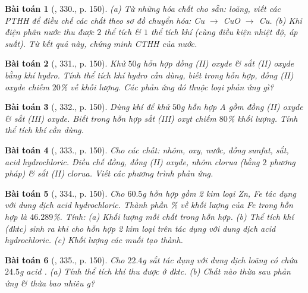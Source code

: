 \documentclass{article}
\newtheorem{baitoan}{Bài toán}
\begin{document}
\begin{baitoan}[\cite{An_400_BT_Hoa_Hoc_8_2020}, 330., p. 150]
	(a) Từ những hóa chất cho sẵn: \emph{} loãng, viết các PTHH để điều chế các chất theo sơ đồ chuyển hóa: \emph{Cu $\to$ CuO $\to$ Cu}. (b) Khi điện phân nước thu được $2$ thể tích \emph{} \& $1$ thể tích khí \emph{} (cùng điều kiện nhiệt độ, áp suất). Từ kết quả này, chứng minh CTHH của nước.
\end{baitoan}

\begin{baitoan}[\cite{An_400_BT_Hoa_Hoc_8_2020}, 331., p. 150]
	Khử $50$\emph{g} hỗn hợp đồng (II) oxyde \& sắt (II) oxyde bằng khí hydro. Tính thể tích khí hydro cần dùng, biết trong hỗn hợp, đồng (II) oxyde chiếm $20$\% về khối lượng. Các phản ứng đó thuộc loại phản ứng gì?
\end{baitoan}

\begin{baitoan}[\cite{An_400_BT_Hoa_Hoc_8_2020}, 332., p. 150]
	Dùng khí \emph{} để khử $50$\emph{g} hỗn hợp A gồm đồng (II) oxyde \& sắt (III) oxyde. Biết trong hỗn hợp sắt (III) oxyt chiếm $80$\% khối lượng. Tính thể tích khí \emph{} cần dùng.
\end{baitoan}

\begin{baitoan}[\cite{An_400_BT_Hoa_Hoc_8_2020}, 333., p. 150]
	Cho các chất: nhôm, oxy, nước, đồng sunfat, sắt, acid hydrochloric. Điều chế đồng, đồng (II) oxyde, nhôm clorua (bằng $2$ phương pháp) \& sắt (II) clorua. Viết các phương trình phản ứng.
\end{baitoan}

\begin{baitoan}[\cite{An_400_BT_Hoa_Hoc_8_2020}, 334., p. 150]
	Cho $60.5$\emph{g} hỗn hợp gồm 2 kim loại \emph{Zn, Fe} tác dụng với dung dịch acid hydrochloric. Thành phần \% về khối lượng của \emph{Fe} trong hỗn hợp là $46.289$\%. Tính: (a) Khối lượng mỗi chất trong hỗn hợp. (b) Thể tích khí \emph{} (đktc) sinh ra khi cho hỗn hợp 2 kim loại trên tác dụng với dung dịch acid hydrochloric. (c) Khối lượng các muối tạo thành.
\end{baitoan}

\begin{baitoan}[\cite{An_400_BT_Hoa_Hoc_8_2020}, 335., p. 150]
	Cho $22.4$\emph{g} sắt tác dụng với dung dịch loãng có chứa $24.5$\emph{g} acid \emph{}. (a) Tính thể tích khí \emph{} thu được ở đktc. (b) Chất nào thừa sau phản ứng \& thừa bao nhiêu \emph{g}?	
\end{baitoan}
\end{document}
